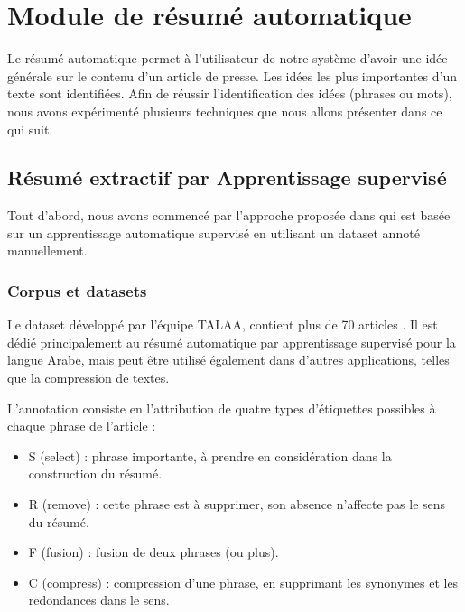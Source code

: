\section{Module de résumé automatique}
Le résumé automatique permet à l'utilisateur de notre système d'avoir une idée générale sur le contenu d'un article de presse. Les idées les plus importantes d'un texte sont identifiées. Afin de réussir l'identification des idées (phrases ou mots), nous avons expérimenté plusieurs techniques que nous allons présenter dans ce qui suit.

    \subsection{Résumé extractif par Apprentissage supervisé}
    Tout d'abord, nous avons commencé par l'approche proposée dans \cite{riad-belkbir} qui est basée sur un apprentissage automatique supervisé en utilisant un dataset annoté manuellement. 
        \subsubsection{Corpus et datasets}
        Le dataset développé par l'équipe TALAA, contient plus de 70 articles \cite{riad-belkbir}. Il est dédié principalement au résumé automatique par apprentissage supervisé pour la langue Arabe, mais peut être utilisé également dans d'autres applications, telles que la compression de textes.

        L'annotation consiste en l'attribution de quatre types d'étiquettes possibles à chaque phrase de l'article :
            \begin{itemize}
                \item S (select) : phrase importante, à prendre en considération dans la construction du résumé.
                \item R (remove) : cette phrase est à supprimer, son absence n'affecte pas le sens du résumé.
                \item F (fusion) : fusion de deux phrases (ou plus).
                \item C (compress) : compression d'une phrase, en supprimant les synonymes et les redondances dans le sens.\\
            \end{itemize}

